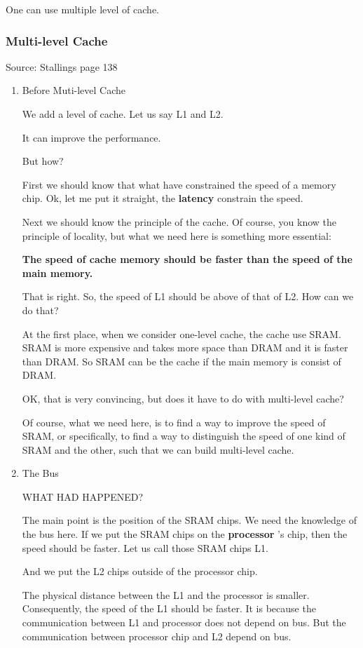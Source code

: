 \documentclass[11pt]{article}
\begin{document}
One can use multiple level of cache.
\subsubsection{Multi-level Cache}
\label{sec:org5a4c4da}
Source: Stallings page 138
\begin{enumerate}
\item Before Muti-level Cache
\label{sec:orgad8c29d}

We add a level of cache. Let us say L1 and L2.

It can improve the performance. 

But how? 

First we should know that what have constrained the speed of a memory chip. Ok, let me put it straight, the \textbf{latency} constrain the speed. 

Next we should know the principle of the cache. Of course, you know the principle of locality, but what we need here is something more essential: 

\textbf{The speed of cache memory should be faster than the speed of the main memory.}

That is right. So, the speed of L1 should be above of that of L2. How can we do that? 

At the first place, when we consider one-level cache, the cache use SRAM. SRAM is more expensive and takes more space than DRAM and it is faster than DRAM. So SRAM can be the cache if the main memory is consist of DRAM.

OK, that is very convincing, but does it have to do with multi-level cache? 

Of course, what we need here, is to find a way to improve the speed of SRAM, or specifically, to find a way to distinguish the speed of one kind of SRAM and the other, such that we can build multi-level cache.

\item The Bus
\label{sec:org3bebe69}

WHAT HAD HAPPENED?

The main point is the position of the SRAM chips. We need the knowledge of the bus here. If we put the SRAM chips on the \textbf{processor}
's chip, then the speed should be faster. Let us call those SRAM chips L1.

And we put the L2 chips outside of the processor chip.

The  physical distance between the L1 and the processor is smaller. Consequently, the speed of the L1 should be faster. It is because the communication between L1 and processor does not depend on bus. But the communication between processor chip and L2 depend on bus.


\end{enumerate}
\end{document}
